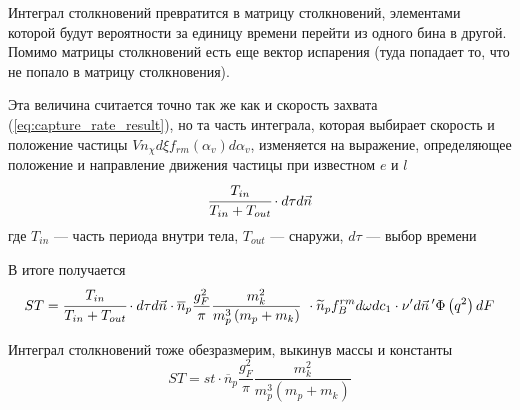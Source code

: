 Интеграл столкновений превратится в матрицу столкновений, элементами которой будут вероятности за единицу времени перейти из одного бина в другой. Помимо матрицы столкновений есть еще вектор испарения (туда попадает то, что не попало в матрицу столкновения).

Эта величина считается точно так же как и скорость захвата (\ref{eq:capture_rate_result}), но та часть интеграла, которая выбирает скорость и положение частицы $Vn_{\chi}d\xi f_{rm}\left( \alpha_{v} \right)d\alpha_{v}$, изменяется на выражение, определяющее положение и направление движения частицы при известном $e$ и $l$
\begin{equation}
	\cfrac{T_{in}}{T_{in}+T_{out}}\cdot d\tau d\vec{n}
\end{equation}
где $T_{in}$ --- часть периода внутри тела, $T_{out}$ --- снаружи, $d\tau$ --- выбор времени 

В итоге получается
\begin{equation}
	\label{eq:st}
	ST = \cfrac{T_{in}}{T_{in}+T_{out}}\cdot d\tau d\vec{n} \cdot \overline{n}_{p}\frac{g_{F}^{2}}{\pi}\frac{m_{k}^{2}}{m_{p}^{3}\left( {m_{p} + m_{k}} \right)}~ \cdot {\widetilde{n}}_{p}f_{B}^{rm}d\omega dc_{1} \cdot \nu' d\vec{n}\,'\Phi\left( q^{2} \right)dF
\end{equation}

Интеграл столкновений тоже обезразмерим, выкинув массы и константы
\begin{equation*}
	ST = st \cdot\overline{n}_{p} \frac{g_{F}^{2}}{\pi}\frac{m_{k}^{2}}{m_{p}^{3}\left( {m_{p} + m_{k}} \right)}
\end{equation*}

